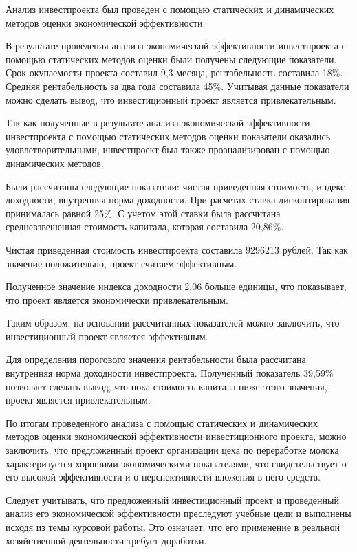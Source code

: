 
Анализ инвестпроекта был проведен с помощью статических и динамических методов оценки экономической эффективности.

В результате проведения анализа экономической эффективности инвестпроекта с помощью статических методов оценки были получены следующие показатели. Срок окупаемости проекта составил 9,3 месяца, рентабельность составила 18\%. Средняя рентабельность за два года составила 45\%. Учитывая данные показатели можно сделать вывод, что инвестиционный проект является привлекательным.

Так как полученные в результате анализа экономической эффективности инвестпроекта с помощью статических методов оценки показатели оказались удовлетворительными, инвестпроект был также проанализирован с помощью динамических методов.

Были рассчитаны следующие показатели: чистая приведенная стоимость, индекс доходности, внутренняя норма доходности. При расчетах ставка дисконтирования принималась равной 25\%. С учетом этой ставки была рассчитана средневзвешенная стоимость капитала, которая составила 20,86\%.

Чистая приведенная стоимость инвестпроекта составила 9296213 рублей. Так как значение положительно, проект считаем эффективным.

Полученное значение индекса доходности 2,06 больше единицы, что показывает, что проект является экономически привлекательным.

Таким образом, на основании рассчитанных показателей можно заключить, что инвестиционный проект является эффективным.

Для определения порогового значения рентабельности была рассчитана внутренняя норма доходности инвестпроекта. Полученный показатель 39,59\% позволяет сделать вывод, что пока стоимость капитала ниже этого значения, проект является привлекательным.

По итогам проведенного анализа с помощью статических и динамических методов оценки экономической эффективности инвестиционного проекта, можно заключить, что предложенный проект организации цеха по переработке молока характеризуется хорошими экономическими показателями, что свидетельствует о его высокой эффективности и о перспективности вложения в него средств.

Следует учитывать, что предложенный инвестиционный проект и проведенный анализ его экономической эффективности преследуют учебные цели и выполнены исходя из темы курсовой работы. Это означает, что его применение в реальной хозяйственной деятельности требует доработки.

